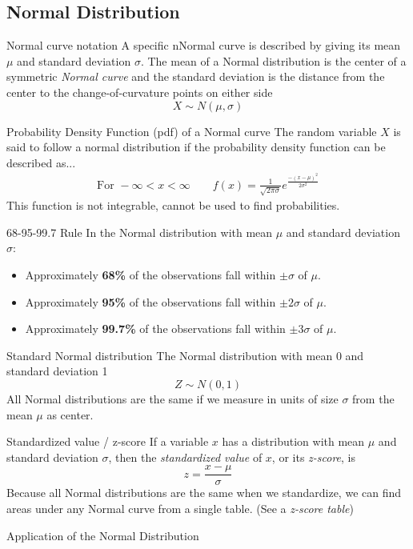 \documentclass[]{article}
\newenvironment{definitions}{
	\begin{description}[font=\sffamily\bfseries, leftmargin=1cm, style=nextline]
	}{
	\end{description}
}
\begin{document}
\subsection{Normal Distribution}
\begin{definitions}
	\item[Normal curve notation]
	A specific nNormal curve is described by giving its mean $\mu$ and standard deviation $\sigma$. The mean of a Normal distribution is the center of a symmetric \emph{Normal curve} and the standard deviation is the distance from the center to the change-of-curvature points on either side
	\[ X \sim N(\mu, \sigma) \]
	\item[Probability Density Function (pdf) of a Normal curve]
	The random variable $X$ is said to follow a normal distribution if the probability density function can be described as...
	\begin{gather}
		{\text{For }-\infty < x < \infty}
		\qquad
		{f(x) = \frac{1}{\sqrt{2\pi \sigma}}e^{\frac{-(x-\mu)^2}{2\sigma^2}}}
	\end{gather}
	This function is not integrable, cannot be used to find probabilities.
	\item[68-95-99.7 Rule]
	In the Normal distribution with mean $\mu$ and standard deviation $\sigma$:
	\begin{itemize}[itemsep=0pt]
		\item Approximately \textbf{68\%} of the observations fall within $\pm\sigma$ of $\mu$.
		\item Approximately \textbf{95\%} of the observations fall within $\pm2\sigma$ of $\mu$.
		\item Approximately \textbf{99.7\%} of the observations fall within $\pm3\sigma$ of $\mu$.
	\end{itemize}
	\item[Standard Normal distribution]
	The Normal distribution with mean 0 and standard deviation 1
	\[ Z \sim N(0,1) \]
	All Normal distributions are the same if we measure in units of size $\sigma$ from the mean $\mu$ as center.
	\item[Standardized value / z-score]
	If a variable $x$ has a distribution with mean $\mu$ and standard deviation $\sigma$, then the \emph{standardized value} of $x$, or its \emph{z-score}, is
	\[ z = \frac{x - \mu}{\sigma} \]
	Because all Normal distributions are the same when we standardize, we can find areas under any Normal curve from a single table. (See a \emph{z-score table})
	\item[Application of the Normal Distribution]

\end{definitions}
\end{document}
